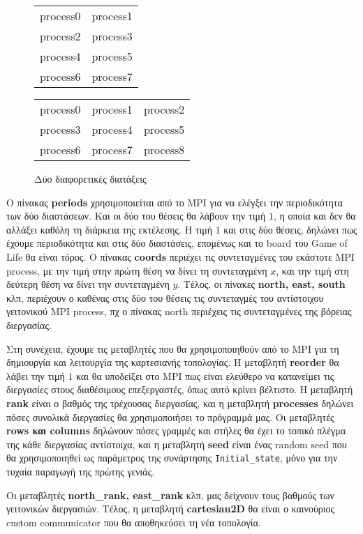 \begin{figure}[h]
\centering
\begin{minipage}{0.45\textwidth}
\centering
\begin{tabular}{cc}
    process0 & process1 \\
    process2 & process3 \\
    process4 & process5 \\
    process6 & process7
\end{tabular}
\end{minipage}\hfill
\begin{minipage}{0.45\textwidth}
\centering
\begin{tabular}{ccc}
    process0 & process1 & process2 \\
    process3 & process4 & process5 \\
    process6 & process7 & process8
\end{tabular}
\end{minipage}
\caption{Δύο διαφορετικές διατάξεις}
\label{fig:cartesian}
\end{figure}

\begin{multicols}{2}
Ο πίνακας \textbf{periods} χρησιμοποιείται από το MPI για να ελέγξει την περιοδικότητα των δύο διαστάσεων. Και οι δύο του θέσεις θα λάβουν την τιμή $1$, η οποία και δεν θα αλλάξει καθόλη τη διάρκεια της εκτέλεσης. Η τιμή $1$ και στις δύο θέσεις, δηλώνει πως έχουμε περιοδικότητα και στις δύο διαστάσεις, επομένως και το board του Game of Life θα είναι τόρος. Ο πίνακας \textbf{coords} περιέχει τις συντεταγμένες του εκάστοτε MPI process, με την τιμή στην πρώτη θέση να δίνει τη συντεταγμένη $x$, και την τιμή στη δεύτερη θέση να δίνει την συντεταγμένη $y$. Τέλος, οι πίνακες \textbf{north, east, south} κλπ, περιέχουν ο καθένας στις δύο του θέσεις τις συντεταγμές του αντίστοιχου γειτονικού MPI process, πχ ο πίνακας north περιέχεις τις συντεταγμένες της βόρειας διεργασίας. \par
Στη συνέχεια, έχουμε τις μεταβλητές που θα χρησιμοποιηθούν από το MPI για τη δημιουργία και λειτουργία της καρτεσιανής τοπολογίας. Η μεταβλητή \textbf{reorder} θα λάβει την τιμή $1$ και θα υποδείξει στο MPI πως είναι ελεύθερο να κατανείμει τις διεργασίες στους διαθέσιμους επεξεργαστές, όπως αυτό κρίνει βέλτιστο. Η μεταβλητή \textbf{rank} είναι ο βαθμός της τρέχουσας διεργασίας, και η μεταβλητή \textbf{processes} δηλώνει πόσες συνολικά διεργασίες θα χρησιμοποιήσει το πρόγραμμά μας. Οι μεταβλητές \textbf{rows και columns} δηλώνουν πόσες γραμμές και στήλες θα έχει το τοπικό πλέγμα της κάθε διεργασίας αντίστοιχα, και η μεταβλητή \textbf{seed} είναι ένας random seed που θα χρησιμοποιηθεί ως παράμετρος της συνάρτησης \texttt{Initial_state}, μόνο για την τυχαία παραγωγή της πρώτης γενιάς. \par
Οι μεταβλητές \textbf{north\_rank, east\_rank} κλπ, μας δείχνουν τους βαθμούς των γειτονικών διεργασιών. Τέλος, η μεταβλητή \textbf{cartesian2D} θα είναι ο καινούριος custom communicator που θα αποθηκεύσει τη νέα τοπολογία.
\end{multicols}

